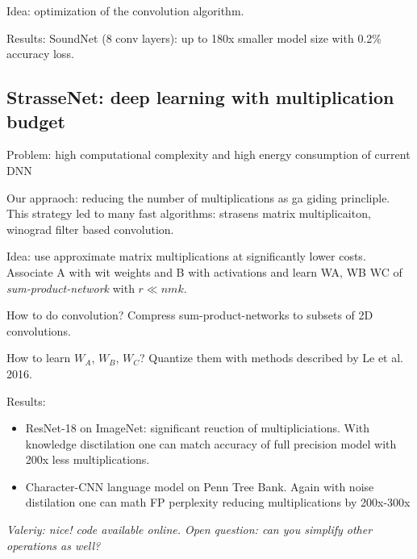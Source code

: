 \documentclass[11pt,oneside,a4paper]{scrartcl}
\newcommand{\valeriy}[1]{{\color{blue}\textit{Valeriy: #1}}}
\begin{document}
Idea: optimization of the convolution algorithm.

Results: SoundNet  (8 conv layers): up to 180x smaller model size with
0.2\% accuracy loss.



\subsection{StrasseNet: deep learning with multiplication budget \cite{tschannen18a}}
\label{sec:strass-deep-learn}

Problem: high computational complexity and high energy consumption of
current DNN

Our appraoch: reducing the number of multiplications as ga giding
princliple. This strategy led to many fast algorithms: strasens matrix
multiplicaiton, winograd filter based convolution.

Idea: use approximate matrix multiplications at significantly lower
costs. Associate A with wit weights and B with activations and learn
WA, WB WC of \emph{sum-product-network} with $r \ll nmk$.

How to do convolution? Compress sum-product-networks to subsets of 2D
convolutions. 

How to learn $W_A$, $W_B$, $W_C$? Quantize them with methods described by Le et
al. 2016. 

Results:
\begin{itemize}
\item ResNet-18 on ImageNet: significant reuction of multipliciations.
  With knowledge disctilation one can match accuracy of full precision
  model with 200x less multiplications.
\item Character-CNN language model on Penn Tree Bank. Again with noise
  distilation one can math FP perplexity reducing multiplications by
  200x-300x
\end{itemize}

\valeriy{nice! code available online. Open question: can you simplify
  other operations as well?}











\end{document}

